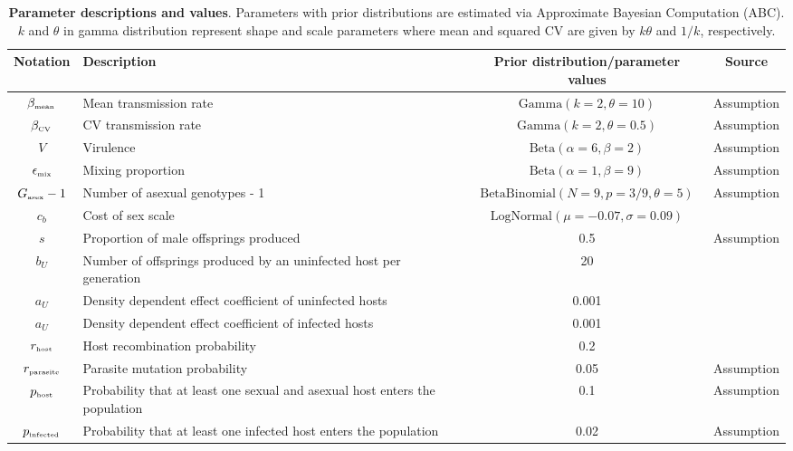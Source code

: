 \documentclass{article}\usepackage[]{graphicx}\usepackage[]{color}
\begin{document}
\begin{table}[h]
\centering
\tiny
\begin{tabular}{c|p{3cm}|c|c}
\hline
\textbf{Notation} & \textbf{Description} & \textbf{Prior distribution/parameter values} & \textbf{Source}\\
\hline
$\beta_{\textrm{\tiny mean}}$ & Mean transmission rate & $\mathrm{Gamma}(k=2, \theta=10)$ & Assumption\\
$\beta_{\textrm{\tiny CV}}$ & CV transmission rate & $\mathrm{Gamma}(k=2, \theta=0.5)$ & Assumption\\
$V$ & Virulence & $\mathrm{Beta}(\alpha=6, \beta=2)$ & Assumption\\
$\epsilon_{\textrm{\tiny mix}}$ & Mixing proportion & $\mathrm{Beta}(\alpha=1, \beta=9)$ & Assumption\\
$G_{\textrm{\tiny asex}}-1$ & Number of asexual genotypes - 1 & $\mathrm{BetaBinomial}(N=9, p=3/9, \theta=5)$ & Assumption\\
$c_b$ & Cost of sex scale & $\mathrm{LogNormal}(\mu=-0.07, \sigma=0.09)$ & \cite{gibson2017two}\\
$s$ & Proportion of male offsprings produced & 0.5 & Assumption\\
$b_U$ & Number of offsprings produced by an uninfected host per generation & 20 & \cite{lively2010epidemiological}\\
$a_U$ & Density dependent effect coefficient of uninfected hosts & 0.001 & \cite{lively2010epidemiological}\\
$a_U$ & Density dependent effect coefficient of infected hosts & 0.001 & \cite{lively2010epidemiological}\\
$r_{\textrm{\tiny host}}$ & Host recombination probability & 0.2 & \cite{lively2010epidemiological}\\
$r_{\textrm{\tiny parasite}}$ & Parasite mutation probability & 0.05 & Assumption\\
$p_{\textrm{\tiny host}}$ & Probability that at least one sexual and asexual host enters the population & 0.1 & Assumption\\
$p_{\textrm{\tiny infected}}$ & Probability that at least one infected host enters the population & 0.02 & Assumption\\
\hline
\end{tabular}
\caption{
\textbf{Parameter descriptions and values}.
Parameters with prior distributions are estimated via Approximate Bayesian Computation (ABC).
$k$ and $\theta$ in gamma distribution represent shape and scale parameters where mean and squared CV are given by $k \theta$ and $1/k$, respectively.
}
\end{table}
\end{document}
